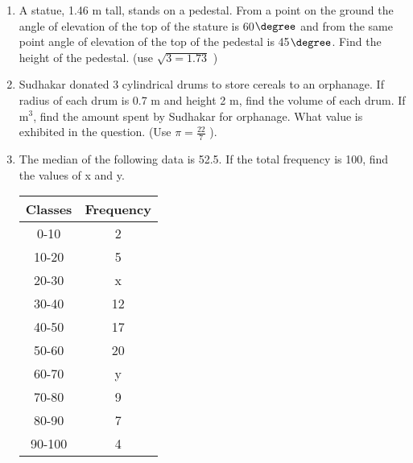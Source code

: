 \documentclass[journal,12pt,twocolumn]{IEEEtran}
\renewcommand\thesection{\arabic{section}}
\begin{document}
\begin{enumerate}[label=\thesection.\arabic*.,ref=\thesection.\theenumi]
\item A statue, 1.46 m tall, stands on a pedestal. From a point on the ground the angle of elevation of the top of the stature is 60$\degree$ and from the same point angle of elevation of the top of the pedestal is 45$\degree$. Find the height of the pedestal. (use $\sqrt{3=1.73}$ ) \\
\item Sudhakar donated 3 cylindrical drums to store cereals to an orphanage. If radius of each drum is 0.7 m and height 2 m, find the volume of each drum. If m$^3$, find the amount spent by Sudhakar for orphanage. What value is exhibited in the question. (Use $\pi = \frac{22}{7}$ ).\\
\item The median of the following data is 52.5. If the total frequency is 100, find the values of x and y.\\
\begin{tabular}{|c|c|}
    \hline
    \textbf{Classes} & \textbf{Frequency}  \\
    \hline
    0-10 & 2 \\
    \hline    10-20 & 5 \\
    \hline    20-30 & x \\    \hline
    30-40 & 12 \\    \hline
    40-50 & 17 \\    \hline
    50-60 & 20 \\    \hline
    60-70 & y \\    \hline
    70-80 & 9\\    \hline
    80-90 & 7 \\    \hline
    90-100 & 4  \\   \hline
\end{tabular}
\end{enumerate}
\end{document}
